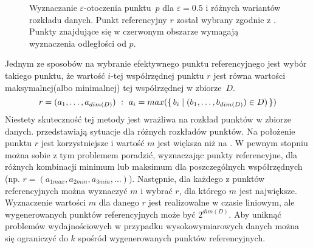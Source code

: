 \begin{figure}
\begin{minipage}[b]{.5\linewidth}
		\subcaption{}\label{img:ti-max-ref-bad}
	\end{minipage}
	\caption{Wyznaczanie $ \varepsilon $-otoczenia \mbox{punktu $ p $} dla $ \varepsilon =0.5 $ i różnych wariantów rozkładu danych. Punkt referencyjny $ r $ został wybrany zgodnie z . Punkty znajdujące się w czerwonym obszarze wymagają wyznaczenia odległości od $ p $.}\label{img:ti-max-ref}
\end{figure}

Jednym ze sposobów na wybranie efektywnego punktu referencyjnego jest wybór takiego punktu, że wartość $i $-tej współrzędnej punktu $ r $ jest równa wartości maksymalnej(albo minimalnej) tej współrzędnej w \mbox{zbiorze $ D $.}
\begin{equation}\label{eq:ti-max-ref}
	r=(a_1,\dots,a_{dim(D)})\ :\ a_i = max(\set{b_i | (b_1,\dots,b_{dim(D)}) \in D)})
\end{equation}
Niestety skuteczność tej metody jest wrażliwa na rozkład punktów w zbiorze danych.  przedstawiają sytuacje dla różnych rozkładów punktów. Na  położenie punktu $ r $ jest korzystniejsze i wartość $ m $ jest większa niż na . W pewnym stopniu można sobie z tym problemem poradzić, wyznaczając punkty referencyjne, dla różnych kombinacji minimum lub maksimum dla poszczególnych współrzędnych (np. $ r=(a_{1max}, a_{2min}, a_{3min}, \dots) $). Następnie, dla każdego z punktów referencyjnych można wyznaczyć $ m $ i wybrać $ r $, dla którego $ m $ jest największe. Wyznaczenie wartości $ m $ dla danego $ r $ jest realizowalne w czasie liniowym, ale wygenerowanych punktów referencyjnych może być $ 2^{dim(D)} $. Aby uniknąć problemów wydajnościowych w przypadku wysokowymiarowych danych można się ograniczyć do $ k $ spośród wygenerowanych punktów referencyjnych. 

